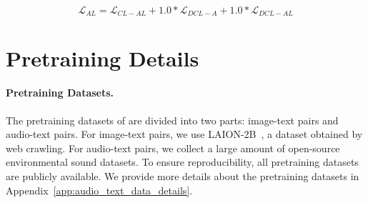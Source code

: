 \begin{equation}
\mathcal{L}_{AL} = \mathcal{L}_{CL-AL} + 1.0*\mathcal{L}_{DCL-A} + 1.0*\mathcal{L}_{DCL-AL}
\end{equation}


\section{Pretraining Details}


\paragraph{Pretraining Datasets.}
The pretraining datasets of \onepeace are divided into two parts: image-text pairs and audio-text pairs. 
For image-text pairs, we use LAION-2B~\cite{laion5b}, a dataset obtained by web crawling.
For audio-text pairs, we collect a large amount of open-source environmental sound datasets.
To ensure reproducibility, all pretraining datasets are publicly available.
We provide more details about the pretraining datasets in Appendix~\ref{app:audio_text_data_details}.



